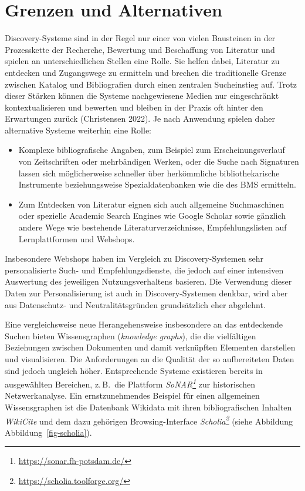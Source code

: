 \documentclass[
  11pt,
  letterpaper,
  DIV=11,
  twoside]{scrreprt}
\DeclareRobustCommand{\href}[2]{#2\footnote{\url{#1}}}
\begin{document}
\section{Grenzen und Alternativen}\label{grenzen-und-alternativen}

Discovery-Systeme sind in der Regel nur einer von vielen Bausteinen in
der Prozesskette der Recherche, Bewertung und Beschaffung von Literatur
und spielen an unterschiedlichen Stellen eine Rolle. Sie helfen dabei,
Literatur zu entdecken und Zugangswege zu ermitteln und brechen die
traditionelle Grenze zwischen Katalog und Bibliografien durch einen
zentralen Sucheinstieg auf. Trotz dieser Stärken können die Systeme
nachgewiesene Medien nur eingeschränkt kontextualisieren und bewerten
und bleiben in der Praxis oft hinter den Erwartungen zurück (Christensen
2022). Je nach Anwendung spielen daher alternative Systeme weiterhin
eine Rolle:

\begin{itemize}
\item
  Komplexe bibliografische Angaben, zum Beispiel zum Erscheinungsverlauf
  von Zeitschriften oder mehrbändigen Werken, oder die Suche nach
  Signaturen lassen sich möglicherweise schneller über herkömmliche
  bibliothekarische Instrumente beziehungsweise Spezialdatenbanken wie
  die des BMS ermitteln.
\item
  Zum Entdecken von Literatur eignen sich auch allgemeine Suchmaschinen
  oder spezielle Academic Search Engines wie Google Scholar sowie
  gänzlich andere Wege wie bestehende Literaturverzeichnisse,
  Empfehlungslisten auf Lernplattformen und Webshops.
\end{itemize}

Insbesondere Webshops haben im Vergleich zu Discovery-Systemen sehr
personalisierte Such- und Empfehlungsdienste, die jedoch auf einer
intensiven Auswertung des jeweiligen Nutzungsverhaltens basieren. Die
Verwendung dieser Daten zur Personalisierung ist auch in
Discovery-Systemen denkbar, wird aber aus Datenschutz- und
Neutralitätsgründen grundsätzlich eher abgelehnt.

Eine vergleichsweise neue Herangehensweise insbesondere an das
entdeckende Suchen bieten Wissensgraphen (\emph{knowledge graphs}), die
die vielfältigen Beziehungen zwischen Dokumenten und damit verknüpften
Elementen darstellen und visualisieren. Die Anforderungen an die
Qualität der so aufbereiteten Daten sind jedoch ungleich höher.
Entsprechende Systeme existieren bereits in ausgewählten Bereichen,
z.\,B.~die Plattform \emph{\href{https://sonar.fh-potsdam.de/}{SoNAR}}
zur historischen Netzwerkanalyse. Ein ernstzunehmendes Beispiel für
einen allgemeinen Wissensgraphen ist die Datenbank Wikidata mit ihren
bibliografischen Inhalten \emph{WikiCite} und dem dazu gehörigen
Browsing-Interface \emph{\href{https://scholia.toolforge.org/}{Scholia}}
(siehe Abbildung Abbildung~\ref{fig-scholia}).
\end{document}
